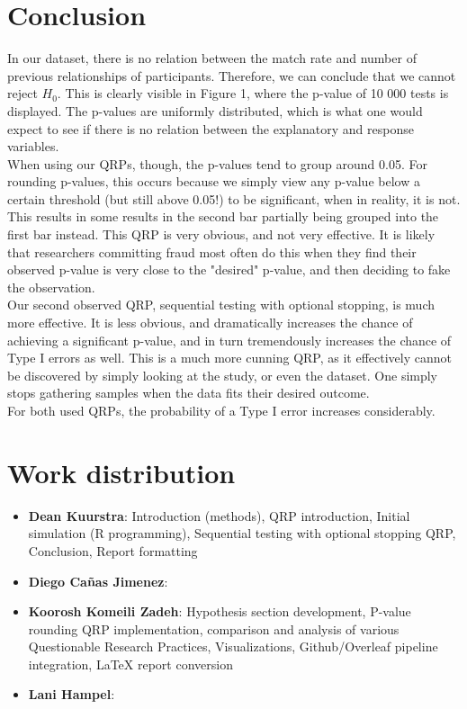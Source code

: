 \documentclass[12pt]{article}
\begin{document}
\section{Conclusion}
    In our dataset, there is no relation between the match rate and number of previous relationships of participants. Therefore, we can conclude that we cannot reject $H_0$. This is clearly visible in Figure 1, where the p-value of 10 000 tests is displayed. The p-values are uniformly distributed, which is what one would expect to see if there is no relation between the explanatory and response variables. \\
    When using our QRPs, though, the p-values tend to group around 0.05. For rounding p-values, this occurs because we simply view any p-value below a certain threshold (but still above 0.05!) to be significant, when in reality, it is not. This results in some results in the second bar partially being grouped into the first bar instead. This QRP is very obvious, and not very effective. It is likely that researchers committing fraud most often do this when they find their observed p-value is very close to the "desired" p-value, and then deciding to fake the observation. \\
    Our second observed QRP, sequential testing with optional stopping, is much more effective. It is less obvious, and dramatically increases the chance of achieving a significant p-value, and in turn tremendously increases the chance of Type I errors as well. This is a much more cunning QRP, as it effectively cannot be discovered by simply looking at the study, or even the dataset. One simply stops gathering samples when the data fits their desired outcome. \\
    For both used QRPs, the probability of a Type I error increases considerably.

\section{Work distribution}
    \begin{itemize}
        \item[] \textbf{Dean Kuurstra}: Introduction (methods), QRP introduction, Initial simulation (R programming), Sequential testing with optional stopping QRP, Conclusion, Report formatting
        \item[] \textbf{Diego Cañas Jimenez}:
        \item[] \textbf{Koorosh Komeili Zadeh}: Hypothesis section development, P-value rounding QRP implementation, comparison and analysis of various Questionable Research Practices, Visualizations,  Github/Overleaf pipeline integration, LaTeX report conversion
        \item[] \textbf{Lani Hampel}:
        \\
    \end{itemize}

 

\end{document}
